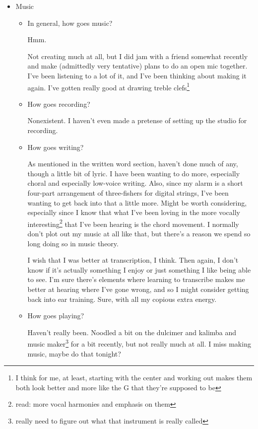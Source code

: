 \documentclass[12pt]{article}
\renewcommand{\,}{\textsuperscript{,}}
\begin{document}
\begin{itemize}
\begin{itemize}
\begin{itemize}
\end{itemize}

\item Music

\begin{itemize}

\item In general, how goes music?

Hmm. 

Not creating much at all, but I did jam with a friend somewhat recently and make (admittedly very tentative) plans to do an open mic together.
I've been listening to a lot of it, and I've been thinking about making it again.
I've gotten really good at drawing treble clefs\footnote{I think for me, at least, starting with the center and working out makes them both look better and more like the G that they're supposed to be}

\item How goes recording?

Nonexistent. I haven't even made a pretense of setting up the studio for recording.

\item How goes writing?

As mentioned in the written word section, haven't done much of any, though a little bit of lyric.
I have been wanting to do more, especially choral and especially low-voice writing.
Also, since my alarm is a short four-part arrangement of three-fishers for digital strings, I've been wanting to get back into that a little more.
Might be worth considering, especially since I know that what I've been loving in the more vocally interesting\footnote{read: more vocal harmonies and emphasis on them} that I've been hearing is the chord movement.
I normally don't plot out my music at all like that, but there's a reason we spend so long doing so in music theory.

I wish that I was better at transcription, I think.
Then again, I don't know if it's actually something I enjoy or just something I like being able to see.
I'm sure there's elements where learning to transcribe makes me better at hearing where I've gone wrong, and so I might consider getting back into ear training.
Sure, with all my copious extra energy.

\item How goes playing?

Haven't really been.
Noodled a bit on the dulcimer and kalimba and music maker\footnote{really need to figure out what that instrument is really called} for a bit recently, but not really much at all.
I miss making music, maybe do that tonight?


\end{itemize}
\end{itemize}
\end{itemize}
\end{document}
